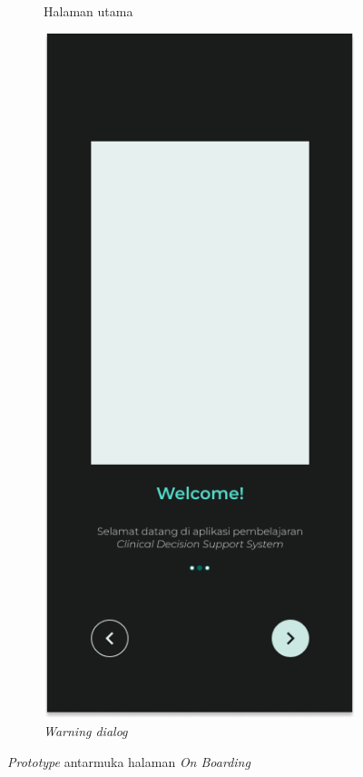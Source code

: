 \begin{figure}[H]
\begin{subfigure}[b]{0.23\textwidth}
	  \caption{Halaman utama}
	  \label{fig:HasilBoarding}
	\end{subfigure}
	\begin{subfigure}[b]{0.23\textwidth}
		\centering
	  \includegraphics[width=\linewidth]{contents/chapter-3/images/HF-Boarding-dt.png}
	  \caption{\textit{Warning dialog}}
	  \label{fig:HasilBoarding2}
	\end{subfigure}
	\caption{\textit{Prototype} antarmuka halaman \textit{On Boarding}}
	\label{Fig:HasilFeatureSetBoarding}
\end{figure}
